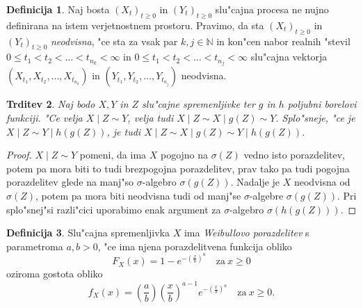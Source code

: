 \documentclass[12pt, a4paper, reqno]{amsart}
\theoremstyle{definition}
\newtheorem{definicija}{Definicija}[section]
\theoremstyle{plain}
\newtheorem{trditev}[definicija]{Trditev}
\newcommand{\N}{\mathbb{N}}
\newcommand{\Prob}{\mathbb{P}}
\newcommand{\1}{\mathds{1}}
\begin{document}
    \begin{definicija}
        Naj bosta $(X_t)_{t\geq0}$ in $(Y_t)_{t\geq0}$ slu"cajna procesa ne nujno definirana na istem 
        verjetnostnem prostoru. Pravimo, da sta $(X_t)_{t\geq0}$ in $(Y_t)_{t\geq0}$ \textit{neodvisna}, 
        "ce sta za vsak par $k,j \in \N$ in kon"cen nabor realnih "stevil $0 \leq t_1 < t_2 < \ldots < t_{n_k} < \infty$ in 
        $0 \leq t_1 < t_2 < \ldots < t_{n_j} < \infty$ slu"cajna 
        vektorja $(X_{t_1}, X_{t_2}, \ldots, X_{t_{n_k}})$ in $(Y_{t_1}, Y_{t_2}, \ldots, Y_{t_{n_j}})$ neodvisna.
        \label{def:neodvisnostSP}
    \end{definicija}


    \begin{trditev}
        Naj bodo $X, Y$ in $Z$ slu"cajne spremenljivke ter $g$ in $h$ poljubni borelovi funkciji. 
        "Ce velja $X\mid Z\sim Y$, velja tudi $X\mid Z\sim X\mid g(Z)\sim Y$. Splo"sneje, 
        "ce je $X\mid Z \sim Y\mid h(g(Z))$, je tudi $X\mid Z\sim X\mid g(Z) \sim Y\mid h(g(Z)).$
        \label{trd:pogojneLastnosti}
    \end{trditev}

    \begin{proof}
        $X\mid Z\sim Y$ pomeni, da ima $X$ pogojno na $\sigma(Z)$ vedno isto porazdelitev, potem pa mora
        biti to tudi brezpogojna porazdelitev, prav tako pa tudi pogojna porazdelitev glede
        na manj"so $\sigma$-algebro $\sigma(g(Z))$. Nadalje je $X$ neodvisna od $\sigma(Z)$, potem pa 
        mora biti neodvisna tudi od manj"se $\sigma$-algebre $\sigma(g(Z))$. Pri splo"snej"si razli"cici 
        uporabimo enak argument za $\sigma$-algebro $\sigma(h(g(Z)))$.
        
    \end{proof}

    \begin{definicija}
        Slu"cajna spremenljivka $X$ ima \textit{Weibullovo porazdelitev} s parametroma $a, b > 0$, 
        "ce ima njena porazdelitvena funkcija obliko 
        \begin{equation*}
            F_X(x) = 1 - e^{-\left(\tfrac{x}{b}\right)^a} \quad \text{za} \ x\geq 0
        \end{equation*}
        oziroma gostota obliko
        \begin{equation*}
            f_X(x) = \left(\frac{a}{b}\right)\left(\frac{x}{b}\right)^{a-1}e^{-\left(\tfrac{x}{b}\right)^a} \quad \text{za} \ x\geq 0.
        \end{equation*}
        \label{def:WeibullovaPorazdelitev}
    \end{definicija}
\end{document}
